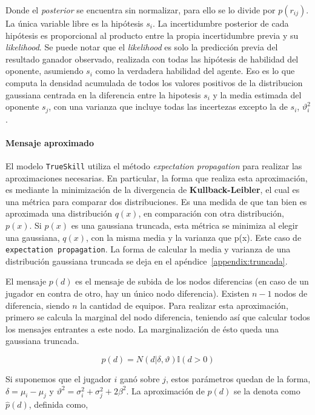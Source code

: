 \documentclass[11pt,twoside,spanish]{report} %
\begin{document}
Donde el \textit{posterior} se encuentra sin normalizar, para ello se lo divide por $p(r_{ij})$.
La \'unica variable libre es la hip\'otesis $s_i$.
La incertidumbre posterior de cada hip\'otesis es proporcional al producto entre la propia incertidumbre previa y su \textit{likelihood}.
Se puede notar que el \textit{likelihood} es solo la predicci\'on previa del resultado ganador observado, realizada con todas las hip\'otesis de habilidad del oponente, asumiendo $s_i$ como la verdadera habilidad del agente.
Eso es lo que computa la densidad acumulada de todos los valores positivos de la distribucion gaussiana centrada en la diferencia entre la hipotesis $s_i$ y la media estimada del oponente $s_j$, con una varianza que incluye todas las incertezas excepto la de $s_i$, $\vartheta_i^2$.

\paragraph{Mensaje aproximado}

El modelo \texttt{TrueSkill} utiliza el m\'etodo \textit{expectation propagation} para realizar las aproximaciones necesarias.
En particular, la forma que realiza esta aproximaci\'on, es mediante la minimizaci\'on de la divergencia de \textbf{Kullback-Leibler}, el cual es una m\'etrica para comparar dos distribuciones.
Es una medida de que tan bien es aproximada una distribuci\'on $q(x)$, en comparaci\'on con otra distribuci\'on, $p(x)$.
Si $p(x)$ es una gaussiana truncada, esta m\'etrica se minimiza al elegir una gaussiana,  $q(x)$, con la misma media y la varianza que p(x).
Este caso de \texttt{expectation propagation}.
La forma de calcular la media y varianza de una distribuci\'on gaussiana truncada se deja en el ap\'endice~\ref{appendix:truncada}.


El mensaje $p(d)$ es el mensaje de subida de los nodos diferencias (en caso de un jugador en contra de otro,  hay un \'unico nodo diferencia).
Existen $n-1$ nodos de diferencia, siendo $n$ la cantidad de equipos.
Para realizar esta aproximaci\'on, primero se calcula la marginal del nodo diferencia, teniendo as\'i que calcular todos los mensajes entrantes a este nodo.
La marginalizaci\'on de \'esto queda una gaussiana truncada.

\begin{equation}
	p(d) = N(d|\delta,\vartheta) \mathbb{I}(d > 0)
\end{equation}

Si suponemos que el jugador $i$ gan\'o sobre $j$, estos par\'ametros quedan de la forma, $\delta = \mu_{i}-\mu_{j}$ y
$\vartheta^2 = \sigma_i^2 + \sigma_j^2+2\beta^2$.
La aproximaci\'on  de $p(d)$ se la denota como $\widehat{p}(d)$, definida como,
\end{document}
